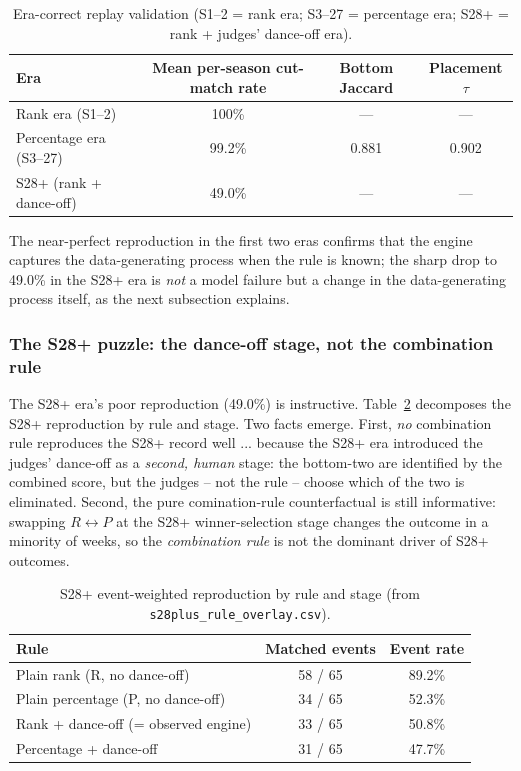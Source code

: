 \documentclass[10pt]{article}
\begin{document}
\begin{table}[H]
\centering
\caption{Era-correct replay validation (S1--2 = rank era; S3--27 = percentage era;
S28+ = rank + judges' dance-off era).}
\label{tab:replay-valid}
\begin{tabular}{lccc}
\toprule
Era & Mean per-season cut-match rate & Bottom Jaccard & Placement $\tau$ \\
\midrule
Rank era (S1--2)   & 100\%  & ---   & --- \\
Percentage era (S3--27) & 99.2\% & 0.881 & 0.902 \\
S28+ (rank + dance-off) & 49.0\% & --- & --- \\
\bottomrule
\end{tabular}
\end{table}

The near-perfect reproduction in the first two eras confirms that the engine captures
the dat\-a-generating process when the rule is known; the sharp drop to 49.0\% in the
S28+ era is \emph{not} a model failure but a change in the data-generating process itself,
as the next subsection explains.

\subsubsection{The S28+ puzzle: the dance-off stage, not the combination rule}

The S28+ era's poor reproduction (49.0\%) is instructive. Table~\ref{tab:s28plus} decomposes
the S28+ reproduction by rule and stage. Two facts emerge. First, \emph{no} combination rule
reproduces the S28+ record well ... because the S28+ era introduced the judges' dance-off
as a \emph{second, human} stage: the bottom-two are identified by the combined score, but
the judges -- not the rule -- choose which of the two is eliminated. Second, the pure
comination-rule counterfactual is still informative: swapping $R \leftrightarrow P$ at
the S28+ winner-selection stage changes the outcome in a minority of weeks, so the
\emph{combination rule} is not the dominant driver of S28+ outcomes.

\begin{table}[H]
\centering
\caption{S28+ event-weighted reproduction by rule and stage (from \texttt{s28plus\_rule\_overlay.csv}).}
\label{tab:s28plus}
\begin{tabular}{lcc}
\toprule
Rule & Matched events & Event rate \\
\midrule
Plain rank (R, no dance-off)  & 58 / 65 & 89.2\% \\
Plain percentage (P, no dance-off) & 34 / 65 & 52.3\% \\
Rank + dance-off (= observed engine) & 33 / 65 & 50.8\% \\
Percentage + dance-off & 31 / 65 & 47.7\% \\
\bottomrule
\end{tabular}
\end{table}
\end{document}
